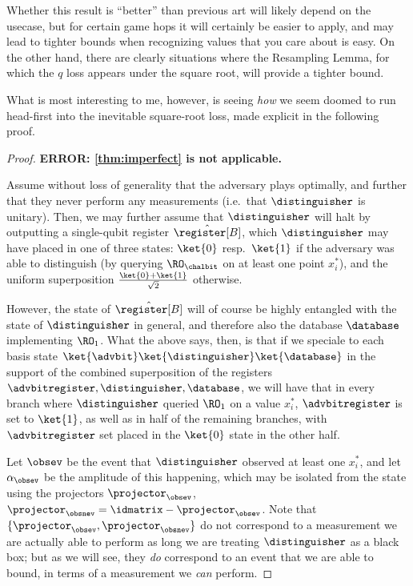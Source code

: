     Whether this result is ``better'' than previous art will
      likely depend on the usecase, but for certain game hops 
      it will certainly be easier to apply, and may lead to tighter bounds when
      recognizing values that you care about is easy. On the other hand, there
      are clearly situations where the Resampling Lemma, for which the
      $q$ loss appears under the square root, will provide a tighter bound.

    What is most interesting to me, however, is seeing \emph{how} we
      seem doomed to run head-first into the inevitable square-root loss, 
      made explicit in the following proof.

    \begin{proof}
      \textbf{ERROR: \autoref{thm:imperfect} is not applicable.} 

      Assume without loss of generality that the adversary plays optimally, and
        further that they never perform any measurements (i.e.\ that
        $\distinguisher$ is
        unitary). Then, we may further assume that $\distinguisher$ will halt by outputting a
        single-qubit register $\hat{\register[B]}$, which $\distinguisher$ may have placed
        in one of three states:
        $\ket{0}$ resp.\ $\ket{1}$ if the adversary was able to distinguish (by
        querying $\RO_\chalbit$ on at least one point $x^*_i$), and
        the uniform superposition $\frac{\ket{0} + \ket{1}}{\sqrt 2}$ otherwise. 

      However, the state of $\hat{\register[B]}$ will of course be highly entangled with
        the state of $\distinguisher$ in general, and therefore also the database $\database$
        implementing $\RO_1$. What the above says, then, is that if we speciale
        to each basis state $\ket{\advbit}\ket{\distinguisher}\ket{\database}$ in the
        support of the combined superposition of the registers $\advbitregister,
        \distinguisher, \database$, we will have that in every branch where
        $\distinguisher$ queried
        $\RO_1$ on a value $x^*_i$, $\advbitregister$ is set to $\ket{1}$, as
        well as in half of the remaining branches, with $\advbitregister$ set
        placed in the $\ket{0}$ state in the other half.

      \noindent
      Let $\obsev$ be the event that $\distinguisher$ observed at least one
        $x^*_i$, and let $\alpha_\obsev$ be the amplitude of this happening,
        which may be isolated from the state using the projectors
        $\projector_\obsev$, $\projector_{\obsnev} = \idmatrix -
        \projector_\obsev$. Note that $\{\projector_\obsev,
        \projector_{\obsnev}\}$ do not correspond to a measurement
        we are actually able to perform as long we are treating $\distinguisher$
        as a black box; but as we will see, they \emph{do} correspond to an event
        that we are able to bound, in terms of a measurement we \emph{can} perform.


\end{proof}
